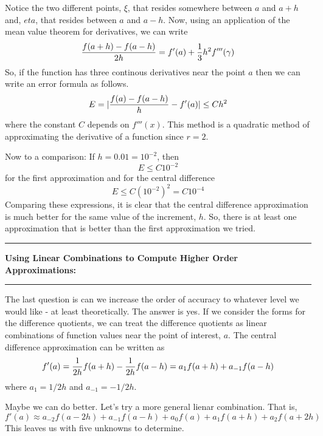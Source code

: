 \documentclass[10pt,fleqn]{article}
\begin{document}
Notice the two different points, \(\xi\), that resides somewhere between \(a\)
and \(a+h\) and, \(eta\), that resides between \(a\) and \(a-h\). Now, using an
application of the mean value theorem for derivatives, we can write
\[
  {{f(a+h)-f(a-h)}\over{2h}} = f'(a) + {1\over 3} h^2 f'''(\gamma)
\]
So, if the function has three continous derivatives near the point \(a\) then
we can write an error formula as follows.
\[
  E = | {{f(a)-f(a-h)}\over{h}} - f'(a) | \leq C h^2 
\]
where the constant \(C\) depends on \(f'''(x)\). This method is a quadratic
method of approximating the derivative of a function since \(r=2\).

Now to a comparison: If \(h=0.01=10^{-2}\), then
\[
  E \leq C 10^{-2}
\]
for the first approximation and for the central difference
\[
  E \leq C (10^{-2})^2 = C 10^{-4}
\]
Comparing these expressions, it is clear that the central difference
approximation is much better for the same value of the increment, \(h\). So,
there is at least one approximation that is better than the first approximation
we tried.
\vskip0.1in\hrule\vskip0.1in\noindent
{\bf Using Linear Combinations to Compute Higher Order Approximations:} 
\vskip0.1in\hrule\vskip0.1in\noindent
The last question is can we increase the order of accuracy to whatever level we
would like - at least theoretically. The answer is yes. If we consider the forms
for the difference quotients, we can treat the difference quotients as linear
combinations of function values near the point of interest, \(a\). The central
difference approximation can be written as
\[
  f'(a) = {1\over{2h}} f(a+h) - {1\over{2h}} f(a-h)
          = a_1 f(a+h) + a_{-1} f(a-h)
\]
where \(a_1=1/2h\) and \(a_{-1}=-1/2h\).

Maybe we can do better. Let's try a more general lienar combination. That is,
\[
  f'(a) \approx a_{-2} f(a-2h) + a_{-1} f(a-h) + a_0 f(a) + a_1 f(a+h)
              + a_2 f(a+2h)
\]
This leaves us with five unknowns to determine.
\end{document}
